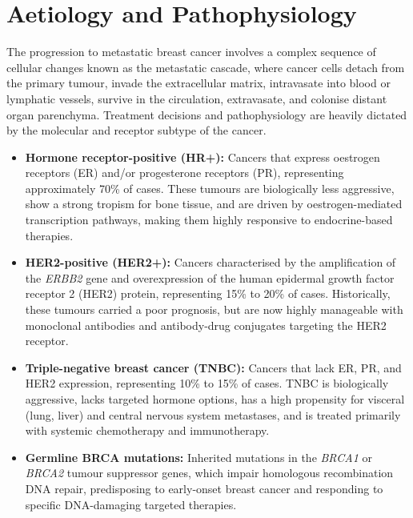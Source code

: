\section*{Aetiology and Pathophysiology}
The progression to metastatic breast cancer involves a complex sequence of cellular changes known as the metastatic cascade, where cancer cells detach from the primary tumour, invade the extracellular matrix, intravasate into blood or lymphatic vessels, survive in the circulation, extravasate, and colonise distant organ parenchyma. Treatment decisions and pathophysiology are heavily dictated by the molecular and receptor subtype of the cancer.
\begin{itemize}
    \item \textbf{Hormone receptor-positive (HR+):} Cancers that express oestrogen receptors (ER) and/or progesterone receptors (PR), representing approximately 70\% of cases. These tumours are biologically less aggressive, show a strong tropism for bone tissue, and are driven by oestrogen-mediated transcription pathways, making them highly responsive to endocrine-based therapies.
    \item \textbf{HER2-positive (HER2+):} Cancers characterised by the amplification of the \textit{ERBB2} gene and overexpression of the human epidermal growth factor receptor 2 (HER2) protein, representing 15\% to 20\% of cases. Historically, these tumours carried a poor prognosis, but are now highly manageable with monoclonal antibodies and antibody-drug conjugates targeting the HER2 receptor.
    \item \textbf{Triple-negative breast cancer (TNBC):} Cancers that lack ER, PR, and HER2 expression, representing 10\% to 15\% of cases. TNBC is biologically aggressive, lacks targeted hormone options, has a high propensity for visceral (lung, liver) and central nervous system metastases, and is treated primarily with systemic chemotherapy and immunotherapy.
    \item \textbf{Germline BRCA mutations:} Inherited mutations in the \textit{BRCA1} or \textit{BRCA2} tumour suppressor genes, which impair homologous recombination DNA repair, predisposing to early-onset breast cancer and responding to specific DNA-damaging targeted therapies.
\end{itemize}

